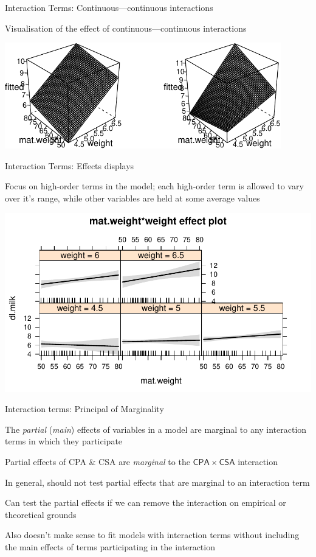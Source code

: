\documentclass[10pt,ignorenonframetext,compress, aspectratio=169]{beamer}
\begin{document}
\begin{frame}{Interaction Terms: Continuous---continuous interactions}

Visualisation of the effect of continuous---continuous interactions

\begin{center}\includegraphics[width=0.9\textwidth]{03-linear-models_files/figure-beamer/kfm-wireframe-1} \end{center}

\end{frame}

\begin{frame}{Interaction Terms: Effects displays}

Focus on high-order terms in the model; each high-order term is allowed
to vary over it's range, while other variables are held at some average
values

\begin{center}\includegraphics[width=0.7\linewidth]{03-linear-models_files/figure-beamer/kfm-effects-1} \end{center}

\end{frame}

\begin{frame}{Interaction terms: Principal of Marginality}

The \emph{partial} (\emph{main}) effects of variables in a model are
\alert{marginal} to any interaction terms in which they participate

Partial effects of CPA \& CSA are \emph{marginal} to the
\(\mathsf{CPA} \times \mathsf{CSA}\) interaction

In general, should not test partial effects that are marginal to an
interaction term

Can test the partial effects if we can remove the interaction on
empirical or theoretical grounds

Also doesn't make sense to fit models with interaction terms without
including the main effects of terms participating in the interaction

\end{frame}
\end{document}

